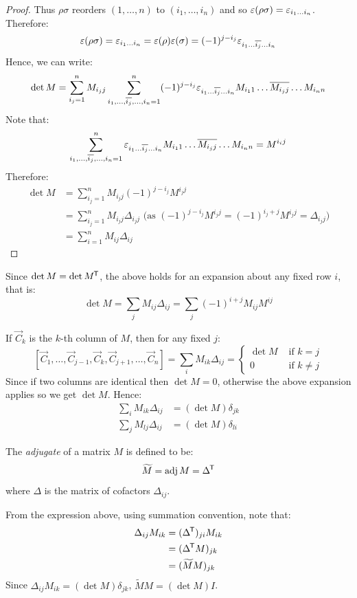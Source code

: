 \documentclass[../main.tex]{subfiles}
\begin{document}
\begin{proof}
  Thus $\rho \sigma$ reorders $(1, \ldots, n)$ to $(i_1, \ldots, i_n)$ and so $\varepsilon(\rho\sigma) = \varepsilon_{i_1 \ldots i_n}$.
  Therefore:
  \[
    \varepsilon(\rho \sigma) = \varepsilon_{i_1 \ldots i_n} = \varepsilon(\rho) \varepsilon(\sigma) = (-1)^{j - i_j} \varepsilon_{i_1 \ldots \overline{i_j} \ldots i_n}
  \]
  Hence, we can write:
  \[
    \det M = \sum_{i_j = 1}^{n} M_{i_j j} \sum_{i_1, \ldots, \overline{i_j}, \ldots, i_n = 1}^n (-1)^{j - i_j} \varepsilon_{i_1 \ldots \overline{i_j} \ldots i_n} M_{i_1 1} \ldots \overline{M_{i_j j}} \ldots M_{i_n n} \\
  \]
  Note that:
  \[
    \sum_{i_1, \ldots, \overline{i_j}, \ldots, i_n = 1}^n \varepsilon_{i_1 \ldots \overline{i_j} \ldots i_n} M_{i_1 1} \ldots \overline{M_{i_j j}} \ldots M_{i_n n} = M^{i_i j}
  \]
  Therefore:
  \begin{align*}
    \det M &= \sum_{i_j = 1}^{n} M_{i_j j}(-1)^{j - i_j} M^{i_j j} \\
           &= \sum_{i_j = 1}^{n}  M_{i_j j} \Delta_{i_j j} \text{ (as $(-1)^{j - i_j}M^{i_j j} = (-1)^{i_j + j}M^{i_j j} = \Delta_{i_j j}$)}\\
           &= \sum_{i = 1}^{n} M_{i j} \Delta_{i j}
  \end{align*}
\end{proof}
\begin{remark}
  Since $\det M = \det M^{{\mkern-1.5mu\mathsf{T}}}$, the above holds for an expansion about any fixed row $i$, that is:
  \[
    \det M = \sum_{j} M_{i j} \Delta_{i j} = \sum_{j} (-1)^{i + j}M_{i j}M^{i j}
  \]
\end{remark}
If $\vec{C}_k$ is the $k$-th column of $M$, then for any fixed $j$:
\[
  [\vec{C}_1, \ldots, \vec{C}_{j - 1}, \vec{C}_k, \vec{C}_{j + 1}, \ldots, \vec{C}_n] = \sum_{i} M_{i k} \Delta_{i j} =
  \begin{cases}
  \det M & \text{ if } k = j \\
  0 & \text{ if } k \neq j
  \end{cases}
\]
Since if two columns are identical then $\det M = 0$, otherwise the above expansion applies so we get $\det M$.
Hence:
\begin{align*}
  \sum_{i} M_{i k}\Delta_{i j} &= (\det M)\delta_{j k} \\
  \sum_{j} M_{l j}\Delta_{i j} &= (\det M)\delta_{l i}
\end{align*}
\begin{definition}[Adjugate]
  The \textit{adjugate} of a matrix $M$ is defined to be: \label{adjugateDef}
  \[
    \widetilde{M} = \operatorname{adj} M = \Delta^{{\mkern-1.5mu\mathsf{T}}}
  \]
  where $\Delta$ is the matrix of cofactors $\Delta_{i j}$.
\end{definition}
From the expression above, using summation convention, note that:
\begin{align*}
  \Delta_{i j}M_{i k} &= (\Delta^{{\mkern-1.5mu\mathsf{T}}})_{j i}M_{i k} \\
                      &= (\Delta^{{\mkern-1.5mu\mathsf{T}}} M)_{j k} \\
                      &= (\widetilde{M} M)_{j k}
\end{align*}
Since $\Delta_{i j}M_{i k} = (\det M)\delta_{j k}$, $\widetilde{M} M = (\det M)I$.
\end{document}
